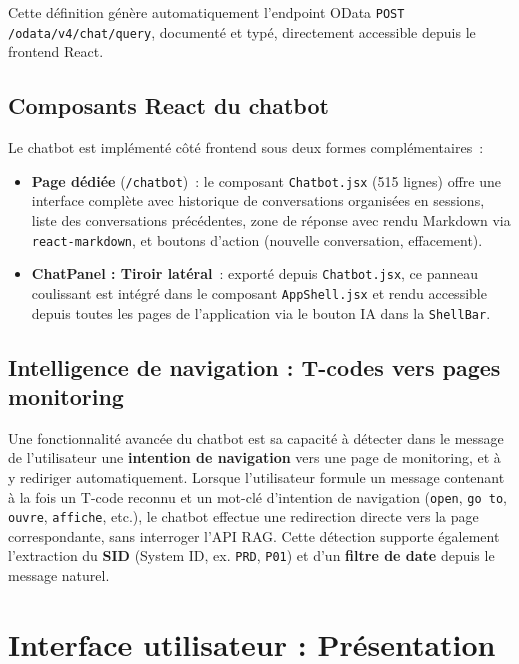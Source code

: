 Cette définition génère automatiquement l'endpoint OData \texttt{POST /odata/v4/chat/query}, documenté et typé, directement accessible depuis le frontend React.



\subsection{Composants React du chatbot}

Le chatbot est implémenté côté frontend sous deux formes complémentaires~:

\begin{itemize}[leftmargin=2em]
  \item \textbf{Page dédiée} (\texttt{/chatbot})~: le composant \texttt{Chatbot.jsx} (515 lignes) offre une interface complète avec historique de conversations organisées en sessions, liste des conversations précédentes, zone de réponse avec rendu Markdown via \texttt{react-markdown}, et boutons d'action (nouvelle conversation, effacement).

  \item \textbf{ChatPanel : Tiroir latéral}~: exporté depuis \texttt{Chatbot.jsx}, ce panneau coulissant est intégré dans le composant \texttt{AppShell.jsx} et rendu accessible depuis toutes les pages de l'application via le bouton IA dans la \texttt{ShellBar}.
\end{itemize}


\subsection{Intelligence de navigation : T-codes vers pages monitoring}

Une fonctionnalité avancée du chatbot est sa capacité à détecter dans le message de l'utilisateur une \textbf{intention de navigation} vers une page de monitoring, et à y rediriger automatiquement. 
Lorsque l'utilisateur formule un message contenant à la fois un T-code reconnu et un mot-clé d'intention de navigation (\texttt{open}, \texttt{go to}, \texttt{ouvre}, \texttt{affiche}, etc.), le chatbot effectue une redirection directe vers la page correspondante, sans interroger l'API RAG. Cette détection supporte également l'extraction du \textbf{SID} (System ID, ex. \texttt{PRD}, \texttt{P01}) et d'un \textbf{filtre de date} depuis le message naturel.

\section{Interface utilisateur : Présentation}

